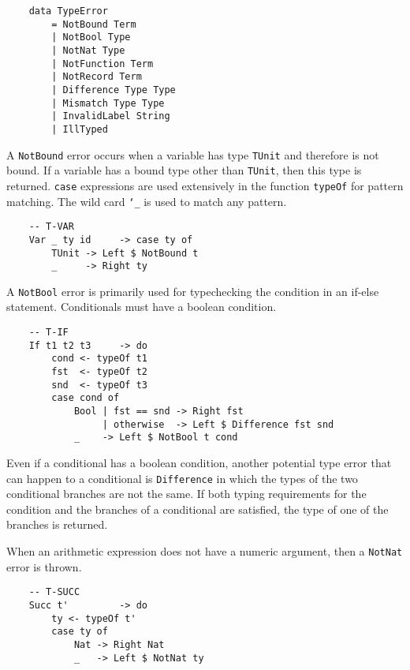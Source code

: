\documentclass[fleqn, 11pt]{article}
\begin{document}
\begin{Verbatim}
    data TypeError 
        = NotBound Term 
        | NotBool Type
        | NotNat Type
        | NotFunction Term
        | NotRecord Term
        | Difference Type Type
        | Mismatch Type Type
        | InvalidLabel String 
        | IllTyped
\end{Verbatim}

A \texttt{NotBound} error occurs when a variable has type \texttt{TUnit} and therefore is not bound. If a variable has a bound type other 
than \texttt{TUnit}, then this type is returned. \texttt{case} expressions are used extensively in the function 
\texttt{typeOf} for pattern matching. The wild card \texttt{\char`_} is used to match any pattern.

\begin{Verbatim}
    -- T-VAR
    Var _ ty id     -> case ty of                           
        TUnit -> Left $ NotBound t   
        _     -> Right ty
\end{Verbatim}

A \texttt{NotBool} error is primarily used for typechecking the condition in an if-else statement. Conditionals must have a boolean condition.

\begin{Verbatim}
    -- T-IF
    If t1 t2 t3     -> do                                       
        cond <- typeOf t1 
        fst  <- typeOf t2 
        snd  <- typeOf t3 
        case cond of 
            Bool | fst == snd -> Right fst 
                 | otherwise  -> Left $ Difference fst snd
            _    -> Left $ NotBool t cond           
\end{Verbatim}

Even if a conditional has a boolean condition, another potential type error that can happen to a conditional is \texttt{Difference} in which 
the types of the two conditional branches are not the same. If both typing requirements for the condition and the branches of a conditional 
are satisfied, the type of one of the branches is returned.

When an arithmetic expression does not have a numeric argument, then a \texttt{NotNat} error is thrown. 

\begin{Verbatim}
    -- T-SUCC
    Succ t'         -> do                                     
        ty <- typeOf t' 
        case ty of  
            Nat -> Right Nat
            _   -> Left $ NotNat ty          
\end{Verbatim}
\end{document}
